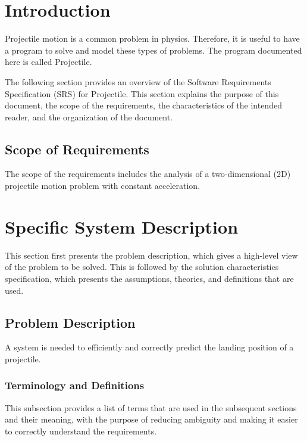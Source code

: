 \documentclass[12pt]{article}
\begin{document}
\section{Introduction}
\label{Sec:Intro}
Projectile motion is a common problem in physics. Therefore, it is useful to have a program to solve and model these types of problems. The program documented here is called Projectile.

The following section provides an overview of the Software Requirements Specification (SRS) for Projectile. This section explains the purpose of this document, the scope of the requirements, the characteristics of the intended reader, and the organization of the document.

\subsection{Scope of Requirements}
\label{Sec:ReqsScope}
The scope of the requirements includes the analysis of a two-dimensional (2D) projectile motion problem with constant acceleration.

\section{Specific System Description}
\label{Sec:SpecSystDesc}
This section first presents the problem description, which gives a high-level view of the problem to be solved. This is followed by the solution characteristics specification, which presents the assumptions, theories, and definitions that are used.

\subsection{Problem Description}
\label{Sec:ProbDesc}
A system is needed to efficiently and correctly predict the landing position of a projectile.

\subsubsection{Terminology and Definitions}
\label{Sec:TermDefs}
This subsection provides a list of terms that are used in the subsequent sections and their meaning, with the purpose of reducing ambiguity and making it easier to correctly understand the requirements.
\end{document}
